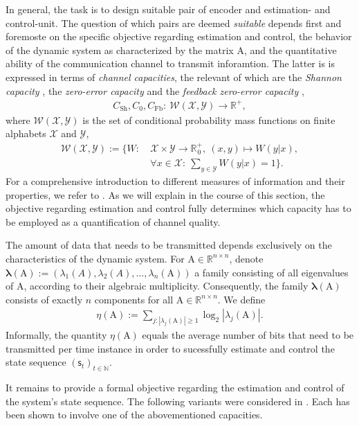\documentclass[conference]{IEEEtran}
\newcommand{\rss}{(\mathsf{s}_t)_{t\in\NN}}
\def\X{{\mathcal X}}
\def\Y{{\mathcal Y}}
\def\W{{\mathcal W}}
\def\NN{{\mathbb N}}
\def\RR{{\mathbb R}}
\def\mA{\bm{\mathrm{A}}}
\begin{document}
	In general, the task is to design suitable pair of encoder and estimation- and control-unit. The question of which pairs are deemed \emph{suitable} 
	depends first and foremoste on the specific objective regarding estimation and control, the behavior of the dynamic system as characterized by the matrix \(\mA\), 
	and the quantitative ability of the communication channel to transmit inforamtion. The latter is is expressed in terms of \emph{channel capacities}, the 
	relevant of which are the \emph{Shannon capacity} \cite{Sh48}, the \emph{zero-error capacity} \cite{Sh56} and the \emph{feedback zero-error capacity} \cite{Sh56}, 
	\begin{align*} C_{\text{Sh}}, C_{0}, C_{\text{Fb}}:~ \W(\X,\Y) \rightarrow \RR_{\hspace{1pt}}^{+},
	\end{align*}
	where \(\W(\X,\Y)\) is the set of conditional probability mass functions on finite alphabets \(\X\) and \(\Y\),
	\begin{align*}	\W(\X,\Y)	:=	\bigg\{ W: 	&~\X \times \Y \rightarrow\RR_{\hspace{1pt}0}^+,~ (x,y) \mapsto W(y|x),\\
												&~\forall x\in\X: ~{\sum}_{y\in\Y} W(y|x) = 1 \bigg\}.
	\end{align*}
	For a comprehensive introduction to different measures of information and their properties, we refer to \cite{CsKo11}.  
	As we will explain in the course of this section, the objective regarding estimation and control fully determines 
	which capacity has to be employed as a quantification of channel quality.
	
	The amount of data that needs to be transmitted depends exclusively on the characteristics of the dynamic system. 
	For \(\mA \in \RR^{n\times n}\), denote \(\bm{\lambda}(\mA) := (\lambda_1(A),\lambda_2(A),\ldots,\lambda_n(\mA))\) a family 
	consisting of all eigenvalues of \(\mA\), according to their algebraic multiplicity. Consequently, the family \(\bm{\lambda}(\mA)\)
	consists of exactly \(n\) components for all \(\mA\in \RR^{n\times n}\). We define
	\begin{align}	\eta(\mA):={\sum}_{j:|\lambda_j(\mA)|\geq 1} \log_2|\lambda_j(\mA)|.
	\end{align}
	Informally, the quantity \(\eta(\mA)\) equals the average number of bits that need to be transmitted per time instance in order
	to sucessfully estimate and control the state sequence \(\rss\).
	
	It remains to provide a formal objective regarding the estimation and control of the system's state sequence. The following variants were considered
	in \cite{MS07, MS07SC}. Each has been shown to involve one of the abovementioned capacities.
	
\end{document}
